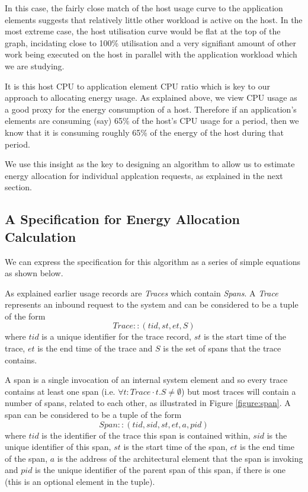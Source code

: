 In this case, the fairly close match of the host usage curve to the application elements suggests that relatively little other workload is active on the host.  In the most extreme case, the host utilisation curve would be flat at the top of the graph, incidating close to 100\% utilisation and a very signifiant amount of other work being executed on the host in parallel with the application workload which we are studying.

It is this host CPU to application element CPU ratio which is key to our approach to allocating energy usage.  As explained above, we view CPU usage as a good proxy for the energy consumption of a host.  Therefore if an application's elements are consuming (say) 65\% of the host's CPU usage for a period, then we know that it is consuming roughly 65\% of the energy of the host during that period.

We use this insight as the key to designing an algorithm to allow us to estimate energy allocation for individual applcation requests, as explained in the next section.


\subsection{A Specification for Energy Allocation Calculation}


We can express the specification for this algorithm as a series of simple equations as shown below.

As explained earlier usage records are \emph{Traces} which contain \emph{Spans}.  A \emph{Trace} represents an inbound request to the system and can be considered to be a tuple of the form 
\begin{equation}
Trace :: (tid, st, et, S)
\end{equation}
where $tid$ is a unique identifier for the trace record, $st$ is the start time of the trace, $et$ is the end time of the trace and $S$ is the set of spans that the trace contains.  

A span is a single invocation of an internal system element and so every trace contains at least one span (i.e. $\forall t : Trace \cdot t.S \neq \emptyset$) but most traces will contain a number of spans, related to each other, as illustrated in Figure \ref{figure:span}.  A span can be considered to be a tuple of the form
\begin{equation}
Span :: (tid, sid, st, et, a, pid)
\end{equation}
where $tid$ is the identifier of the trace this span is contained within, $sid$ is the unique identifier of this span, $st$ is the start time of the span, $et$ is the end time of the span, $a$ is the address of the architectural element that the span is invoking and $pid$ is the unique identifier of the parent span of this span, if there is one (this is an optional element in the tuple).

